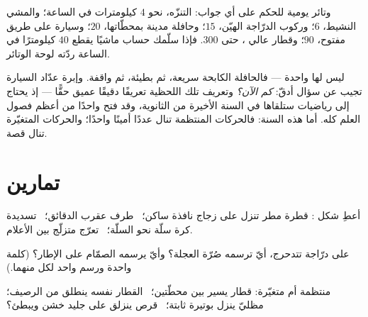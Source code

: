 \begin{example}\label{ex:g6:describing-motion:paces}
وتائر يومية للحكم على أي جواب: التنزّه، نحو $4$ كيلومترات في
الساعة؛ والمشي النشيط، $6$؛ وركوب الدرّاجة الهيّن، $15$؛ وحافلة
مدينة بمحطّاتها، $20$؛ وسيارة على طريق مفتوح، $90$؛ وقطار عالي
، حتى $300$. فإذا سلّمك حساب ماشيًا يقطع $40$ كيلومترًا في
الساعة ردّته لوحة الوتائر.
\end{example}

\begin{remark}\label{rem:g6:describing-motion:instant}
 ليس لها  واحدة --- فالحافلة الكابحة سريعة،
ثم بطيئة، ثم واقفة. وإبرة عدّاد  السيارة تجيب عن سؤال
أدقّ: \emph{كم  الآن؟} وتعريف تلك  اللحظية تعريفًا
دقيقًا عميق حقًّا --- إذ يحتاج إلى رياضيات ستلقاها في السنة
الأخيرة من الثانوية، وقد فتح واحدًا من أعظم فصول العلم كله.
أما هذه السنة: فالحركات المنتظمة تنال عددًا أمينًا واحدًا؛
والحركات المتغيّرة تنال قصة.
\end{remark}

\section{تمارين}

\begin{exercise}[$\star$]\label{exo:g6:describing-motion:1}
أعطِ شكل : قطرة مطر تنزل على زجاج نافذة ساكن؛ \ طرف عقرب
الدقائق؛ \ تسديدة كرة سلّة نحو السلّة؛ \ تعرّج متزلّج بين
الأعلام.
\end{exercise}

\begin{exercise}[$\star$]\label{exo:g6:describing-motion:2}
على درّاجة تتدحرج، أيّ  ترسمه صُرّة العجلة؟ وأيّ  يرسمه
الصمّام على الإطار؟ (كلمة واحدة ورسم واحد لكل منهما.)
\end{exercise}

\begin{exercise}[$\star$]\label{exo:g6:describing-motion:3}
منتظمة أم متغيّرة: قطار يسير بين محطّتين؛ \ القطار نفسه ينطلق
من الرصيف؛ \ مظليّ ينزل بوتيرة ثابتة؛ \ قرص ينزلق على جليد خشن
ويبطئ؟
\end{exercise}


